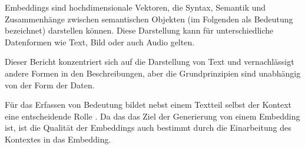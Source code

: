 \documentclass[../main.tex]{subfiles}
\begin{document}
Embeddings sind hochdimensionale Vektoren, die Syntax, Semantik und Zusammenhänge zwischen semantischen Objekten (im Folgenden als Bedeutung bezeichnet) darstellen können.
Diese Darstellung kann für unterschiedliche Datenformen wie Text, Bild oder auch Audio gelten.
\cite{mikolov2013efficient}

Dieser Bericht konzentriert sich auf die Darstellung von Text und vernachlässigt andere Formen in den Beschreibungen, aber die Grundprinzipien sind unabhängig von der Form der Daten.

Für das Erfassen von Bedeutung bildet nebst einem Textteil selbst der Kontext eine entscheidende Rolle \cite{rubenstein1965contextual}.
Da das das Ziel der Generierung von einem Embedding ist, ist die Qualität der Embeddings auch bestimmt durch die Einarbeitung des Kontextes in das Embedding.
\cite{huang-etal-2012-improving}
\end{document}
